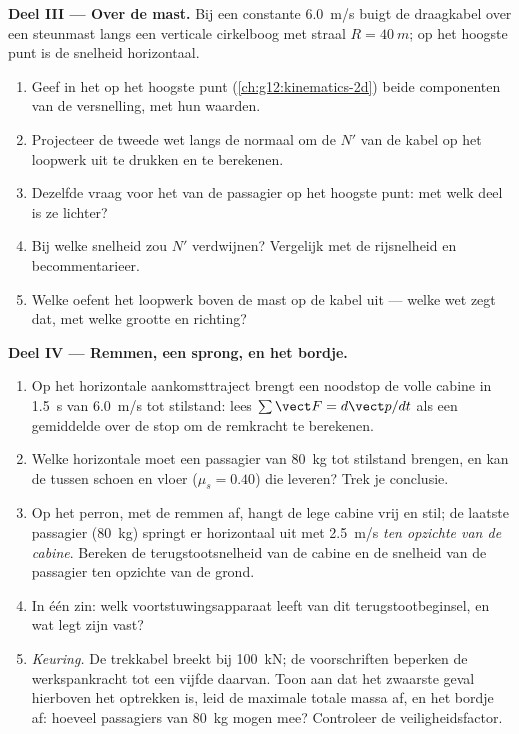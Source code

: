 \begin{problem}
\medskip
\noindent\textbf{Deel III --- Over de mast.} Bij een constante \qty{6.0}{m/s} buigt
de draagkabel over een steunmast langs een verticale cirkelboog met straal
$R = \qty{40}{m}$; op het hoogste punt is de snelheid horizontaal.
\begin{enumerate}[resume]
  \item Geef in het  op het hoogste punt
        (\cref{ch:g12:kinematics-2d}) beide componenten van de versnelling, met hun
        waarden.
  \item Projecteer de tweede wet langs de normaal om de  $N'$ van de
        kabel op het loopwerk uit te drukken en te berekenen.
  \item Dezelfde vraag voor het  van de passagier op het hoogste
        punt: met welk deel is ze lichter?
  \item Bij welke snelheid zou $N'$ verdwijnen? Vergelijk met de rijsnelheid en
        becommentarieer.
  \item Welke  oefent het loopwerk boven de mast op de kabel uit --- welke wet
        zegt dat, met welke grootte en richting?
\end{enumerate}

\medskip
\noindent\textbf{Deel IV --- Remmen, een sprong, en het bordje.}
\begin{enumerate}[resume]
  \item Op het horizontale aankomsttraject brengt een noodstop de volle cabine in
        \qty{1.5}{s} van \qty{6.0}{m/s} tot stilstand: lees
        $\sum \vect F = d\vect p/dt$ als een gemiddelde over de stop om de remkracht
        te berekenen.
  \item Welke horizontale  moet een passagier van \qty{80}{kg} tot stilstand
        brengen, en kan de  tussen schoen en vloer
        ($\mu_s = 0.40$) die leveren? Trek je conclusie.
  \item Op het perron, met de remmen af, hangt de lege cabine vrij en stil; de laatste
        passagier (\qty{80}{kg}) springt er horizontaal uit met \qty{2.5}{m/s}
        \emph{ten opzichte van de cabine}. Bereken de terugstootsnelheid van de
        cabine en de snelheid van de passagier ten opzichte van de grond.
  \item In één zin: welk voortstuwingsapparaat leeft van dit terugstootbeginsel, en
        wat legt zijn  vast?
  \item \emph{Keuring.} De trekkabel breekt bij \qty{100}{kN}; de voorschriften
        beperken de werkspankracht tot een vijfde daarvan. Toon aan dat het zwaarste
        geval hierboven het optrekken is, leid de maximale totale massa af, en 
        het bordje af: hoeveel passagiers van \qty{80}{kg} mogen mee? Controleer de
        veiligheidsfactor.
\end{enumerate}
\end{problem}
